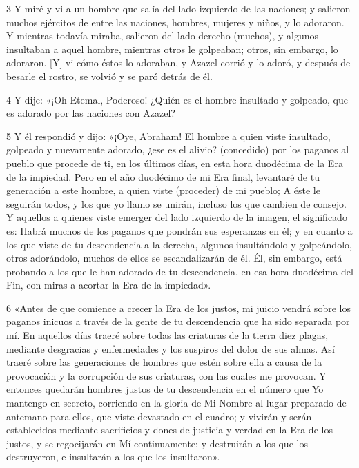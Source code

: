 \par 3 Y miré y vi a un hombre que salía del lado izquierdo de las naciones; y salieron muchos ejércitos de entre las naciones, hombres, mujeres y niños, y lo adoraron. Y mientras todavía miraba, salieron del lado derecho (muchos), y algunos insultaban a aquel hombre, mientras otros le golpeaban; otros, sin embargo, lo adoraron. [Y] vi cómo éstos lo adoraban, y Azazel corrió y lo adoró, y después de besarle el rostro, se volvió y se paró detrás de él.

\par 4 Y dije: «¡Oh Etemal, Poderoso! ¿Quién es el hombre insultado y golpeado, que es adorado por las naciones con Azazel?

\par 5 Y él respondió y dijo: «¡Oye, Abraham! El hombre a quien viste insultado, golpeado y nuevamente adorado, ¿ese es el alivio? (concedido) por los paganos al pueblo que procede de ti, en los últimos días, en esta hora duodécima de la Era de la impiedad. Pero en el año duodécimo de mi Era final, levantaré de tu generación a este hombre, a quien viste (proceder) de mi pueblo; A éste le seguirán todos, y los que yo llamo se unirán, incluso los que cambien de consejo. Y aquellos a quienes viste emerger del lado izquierdo de la imagen, el significado es: Habrá muchos de los paganos que pondrán sus esperanzas en él; y en cuanto a los que viste de tu descendencia a la derecha, algunos insultándolo y golpeándolo, otros adorándolo, muchos de ellos se escandalizarán de él. Él, sin embargo, está probando a los que le han adorado de tu descendencia, en esa hora duodécima del Fin, con miras a acortar la Era de la impiedad».

\par 6 «Antes de que comience a crecer la Era de los justos, mi juicio vendrá sobre los paganos inicuos a través de la gente de tu descendencia que ha sido separada por mí. En aquellos días traeré sobre todas las criaturas de la tierra diez plagas, mediante desgracias y enfermedades y los suspiros del dolor de sus almas. Así traeré sobre las generaciones de hombres que estén sobre ella a causa de la provocación y la corrupción de sus criaturas, con las cuales me provocan. Y entonces quedarán hombres justos de tu descendencia en el número que Yo mantengo en secreto, corriendo en la gloria de Mi Nombre al lugar preparado de antemano para ellos, que viste devastado en el cuadro; y vivirán y serán establecidos mediante sacrificios y dones de justicia y verdad en la Era de los justos, y se regocijarán en Mí continuamente; y destruirán a los que los destruyeron, e insultarán a los que los insultaron».

